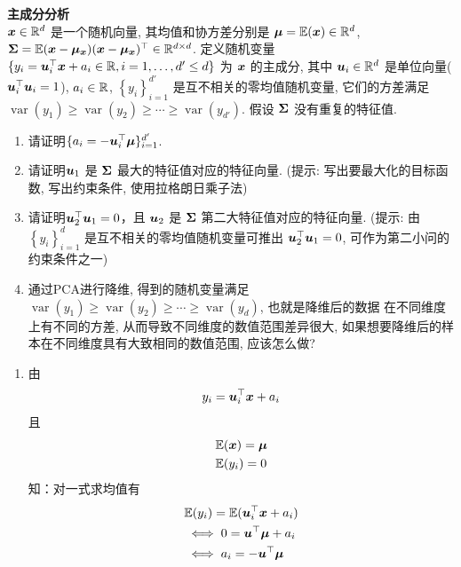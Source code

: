 \documentclass[answers]{exam}  %
\begin{document}
\begin{questions}
\question [20] \textbf{主成分分析} \\
    ${\boldsymbol{x}} \in \mathbb{R}^{d}$ 是一个随机向量, 其均值和协方差分别是 $\boldsymbol{\mu}=\mathbb{E}({\boldsymbol{x}}) \in \mathbb{R}^{d}$, $\boldsymbol{\Sigma}=\mathbb{E}({\boldsymbol{x}}-\boldsymbol{\mu}_{\boldsymbol{x}})({\boldsymbol{x}}-\boldsymbol{\mu}_{\boldsymbol{x}})^{\top} \in \mathbb{R}^{d \times  d}$. 定义随机变量 $\{y_{i}=\boldsymbol{u}_{i}^{\top} {\boldsymbol{x}}+a_{i} \in \mathbb{R}, i=1, \ldots, {d'} \leq d\}$ 为 ${\boldsymbol{x}}$ 的主成分, 其中 $\boldsymbol{u}_{i} \in \mathbb{R}^{d}$ 是单位向量($\boldsymbol{u}_i^\top \boldsymbol{u}_i = 1$), $a_{i} \in \mathbb{R}$, $\left\{y_{i}\right\}_{i=1}^{{d'}}$ 是互不相关的零均值随机变量, 它们的方差满足 $\operatorname{var}\left(y_{1}\right) \geq \operatorname{var}\left(y_{2}\right) \geq \cdots \geq \operatorname{var}\left(y_{{d'}}\right)$. 假设 $\boldsymbol{\Sigma}$ 没有重复的特征值.
\begin{enumerate}
	\item  请证明$\{a_{i}=-\boldsymbol{u}_{i}^{\top} \boldsymbol{\mu}\}_{i=1}^{d'}$.
	\item 请证明$\boldsymbol{u}_{1}$ 是 $\boldsymbol{\Sigma}$ 最大的特征值对应的特征向量. (提示: 写出要最大化的目标函数, 写出约束条件, 使用拉格朗日乘子法)
	\item 请证明$\boldsymbol{u}_{2}^{\top} \boldsymbol{u}_{1}=0$，且 $\boldsymbol{u}_{2}$ 是 $\boldsymbol{\Sigma}$ 第二大特征值对应的特征向量. (提示: 由 $\left\{y_{i}\right\}_{i=1}^{d}$ 是互不相关的零均值随机变量可推出 $\boldsymbol{u}_{2}^{\top} \boldsymbol{u}_{1}=0$, 可作为第二小问的约束条件之一)
	\item 通过PCA进行降维, 得到的随机变量满足$\operatorname{var}\left(y_{1}\right) \geq \operatorname{var}\left(y_{2}\right) \geq \cdots \geq \operatorname{var}\left(y_{d}\right)$, 也就是降维后的数据 在不同维度上有不同的方差, 从而导致不同维度的数值范围差异很大, 如果想要降维后的样本在不同维度具有大致相同的数值范围, 应该怎么做?
\end{enumerate}
	\begin{solution}
	    \begin{enumerate}
            \item 由
            \[y_i=\boldsymbol{u}^\top_i{\boldsymbol{x}}+a_i\]
            且
            \[  \begin{aligned}
                    &\mathbb E({\boldsymbol{x}})=\boldsymbol{\mu}\\
                    &\mathbb E(y_i)=0\\  
                \end{aligned}
            \]
            知：对一式求均值有
            \[
                \begin{aligned}
                    &\mathbb{E}(y_i)=\mathbb{E}(\vu^\top_i\vx+a_i) \\
                    &\iff 0=\vu^\top\vmu+a_i\\
                    &\iff a_i=-\vu^\top\vmu

\end{aligned}\]
\end{enumerate}
\end{solution}
\end{questions}
\end{document}
